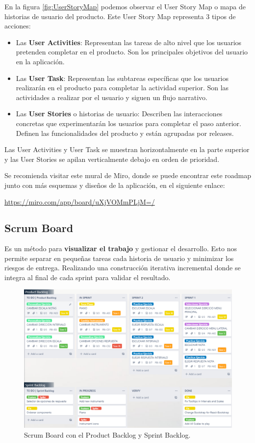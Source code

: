 \documentclass[12pt,twoside,titlepage]{report}
\begin{document}
En la figura \ref{fig:UserStoryMap} podemos observar el User Story Map o mapa de historias de usuario del producto. Este User Story Map representa 3 tipos de acciones:
\begin{itemize}
    \item Las \textbf{User Activities}: Representan las tareas de alto nivel que los usuarios pretenden completar en el producto. Son los principales objetivos del usuario en la aplicación. 
    \item Las \textbf{User Task}: Representan las subtareas específicas que los usuarios realizarán en el producto para completar la actividad superior. Son las actividades a realizar por el usuario y siguen un flujo narrativo. 
    \item Las \textbf{User Stories} o historias de usuario: Describen las interacciones concretas que experimentarán los usuarios para completar el paso anterior. Definen las funcionalidades del producto y están agrupadas por releases.  
\end{itemize}

Las User Activities y User Task se muestran horizontalmente en la parte superior y las User Stories se apilan verticalmente debajo en orden de prioridad.

Se recomienda visitar este mural de Miro, donde se puede encontrar este roadmap junto con más esquemas y diseños de la aplicación, en el siguiente enlace: 

\href{https://miro.com/app/board/uXjVOMmPLjM=/?share_link_id=588058562303}{https://miro.com/app/board/uXjVOMmPLjM=/}

\subsection{Scrum Board}

Es un método para \textbf{visualizar el trabajo} y gestionar el desarrollo. Esto nos permite separar en pequeñas tareas cada historia de usuario y minimizar los riesgos de entrega. Realizando una construcción iterativa incremental donde se integra al final de cada sprint para validar el resultado. 
\cite{scrumboard1}
\cite{scrumboard2}

\begin{figure}[H]
    \centering
    \includegraphics[scale=0.47]{Scrum/ScrumBoard}
    \caption{Scrum Board con el Product Backlog y Sprint Backlog.}
    \label{fig:ScrumBoard}
\end{figure}
\end{document}
